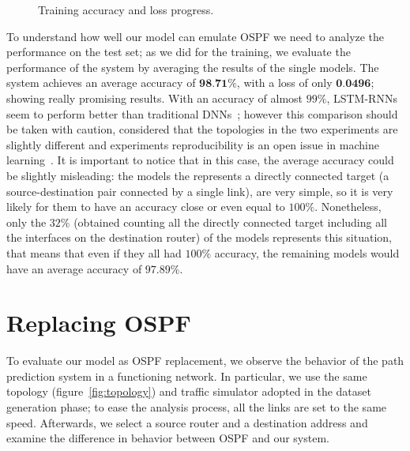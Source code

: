 \begin{figure}
\caption{Training accuracy and loss progress.}
\label{fig:training_avg}
\end{figure}

To understand how well our model can emulate OSPF we need to analyze the performance on the test set; as we did for the training, we evaluate the performance of the system by averaging the results of the single models. The system achieves an average accuracy of $\textbf{98.71\%}$, with a loss of only $\textbf{0.0496}$; showing really promising results. With an accuracy of almost $99\%$, LSTM-RNNs seem to perform better than traditional DNNs~\cite{Kato}; however this comparison should be taken with caution, considered that the topologies in the two experiments are slightly different and experiments reproducibility is an open issue in machine learning~\cite{olorisade2017reproducibility}. It is important to notice that in this case, the average accuracy could be slightly misleading: the models the represents a directly connected target (a source-destination pair connected by a single link), are very simple, so it is very likely for them to have an accuracy close or even equal to $100\%$. Nonetheless, only the $32\%$ (obtained counting all the directly connected target including all the interfaces on the destination router) of the models represents this situation, that means that even if they all had $100\%$ accuracy, the remaining models would have an average accuracy of $97.89\%$.

\section{Replacing OSPF}
To evaluate our model as OSPF replacement, we observe the behavior of the path prediction system in a functioning network. In particular, we  use the same topology (figure~\ref{fig:topology}) and traffic simulator adopted in the dataset generation phase; to ease the analysis process, all the links are set to the same speed. Afterwards, we select a source router and a destination address and examine the difference in behavior between OSPF and our system.

